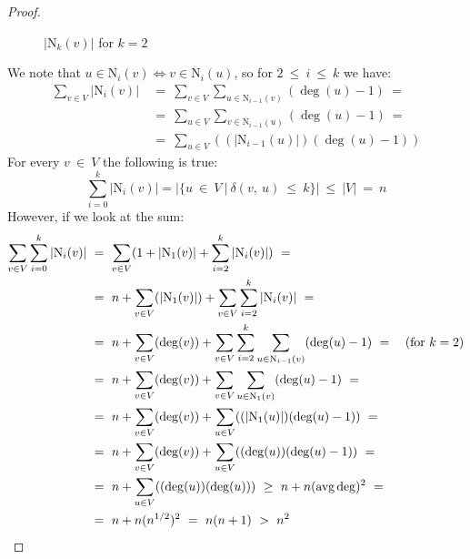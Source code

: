 \documentclass[shortabstract, lic, english]{iithesis}
\theoremstyle{definition} \newtheorem{definition}{Definition}[chapter]
\theoremstyle{plain} \newtheorem{remark}[definition]{Observation}
\theoremstyle{plain} \newtheorem{theorem}[definition]{Theorem}
\theoremstyle{plain} \newtheorem{lemma}[definition]{Lemma}
\theoremstyle{plain} \newtheorem{conjecture}[definition]{Conjecture}
\begin{document}
\begin{proof}
\begin{figure}[h]
    \centering              
    \caption{$|$N$_{k}(v)|$ for $k = 2$}
    \end{figure}

    We note that $u\in $N$_i(v) \iff v \in $N$_i(u)$, so for $2~\leq~i~\leq~k$ we have:
    \begin{align}
    \sum_{v \in V}|\text{N}_i(v)|~
    &=~\sum_{v \in V}\sum_{u \in \text{N}_{i-1}(v)} (\deg(u) - 1)~= \nonumber\\
    &=~\sum_{u \in V}\sum_{v \in \text{N}_{i-1}(u)}(\deg(u) - 1)~= \nonumber\\
    &=~\sum_{u \in V}((|\text{N}_{i-1}(u)|)(\deg(u) - 1)) \nonumber
    \end{align}
    For every $v~\in~V$ the following is true:
    \begin{equation}\label{allNeighboursCount}
    \sum_{i=0}^{k} |\text{N}_i(v)|=|\{u~\in~V~|~\delta(v,~u)~\leq~k\}|~\leq~|V|~=~n
    \end{equation}
    However, if we look at the sum:
    \begin{align}
        \sum_{v \in V}\sum_{i=0}^{k} |\text{N}_i(v)|~&=
        ~\sum_{v \in V}(1 + |\text{N}_1(v)| + \sum_{i=2}^{k} |\text{N}_i(v)|)~= \nonumber\\ 
        &=~n+\sum_{v \in V}(|\text{N}_1(v)|)+\sum_{v \in V}\sum_{i=2}^{k} |\text{N}_i(v)|~= \nonumber\\
        &=~n+\sum_{v \in V}(\deg(v))+\sum_{v \in V}\sum_{i=2}^{k}\sum_{u \in \text{N}_{i-1}(v)} (\deg(u) - 1)~=~~~(\textnormal{for}~k=2) \nonumber\\
        &=~n+\sum_{v \in V}(\deg(v))+\sum_{v \in V}\sum_{u \in \text{N}_1(v)} (\deg(u) -1)~= \nonumber\\
        &=~n+\sum_{v \in V}(\deg(v))+\sum_{u \in V}((|\text{N}_1(u)|)(\deg(u) -1))~= \nonumber\\
        &=~n+\sum_{v \in V}(\deg(v))+\sum_{u \in V}((\deg(u))(\deg(u) -1))~= \nonumber\\
        &=~n+\sum_{u \in V}((\deg(u))(\deg(u)))~\geq~n+n(\textnormal{avg}\deg)^2~= \nonumber\\
        &=~n+n(n^{1/2})^2~=~n(n+1)~>~n^2 \nonumber
    \end{align}


\end{proof}
\end{document}
